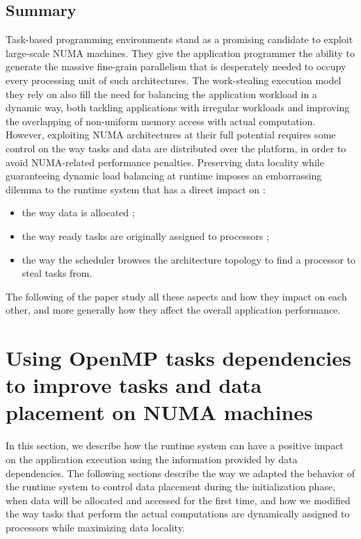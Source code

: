 \documentclass{Styles/llncs}
\begin{document}
\subsection{Summary}
Task-based programming environments stand as a promising candidate to exploit large-scale NUMA machines.
They give the application programmer the ability to generate the massive fine-grain parallelism that is desperately needed to occupy every processing unit of such architectures.
The work-stealing execution model they rely on also fill the need for balancing the application workload in a dynamic way, both tackling applications with irregular workloads and improving the overlapping of non-uniform memory access with actual computation.
However, exploiting NUMA architectures at their full potential requires some control on the way tasks and data are distributed over the platform, in order to avoid NUMA-related performance penalties. 
Preserving data locality while guaranteeing dynamic load balancing at runtime imposes an embarrassing dilemma to the runtime system that has a direct impact on :
\begin{itemize}   
\item the way data is allocated ;
\item the way ready tasks are originally assigned to processors ;
\item the way the scheduler browses the architecture topology to find a processor to steal tasks from.
\end{itemize}

The following of the paper study all these aspects and how they impact on each other, and more generally how they affect the overall application performance.

\section{Using OpenMP tasks dependencies to improve tasks and data
  placement on NUMA machines}

In this section, we describe how the runtime system can have a positive impact on the application execution using the information provided by data dependencies.
The following sections describe the way we adapted the behavior of the runtime system to control data placement during the initialization phase, when data will be allocated and accessed for the first time, and how we modified the way tasks that perform the actual computations are dynamically assigned to processors while maximizing data locality.
\end{document}

